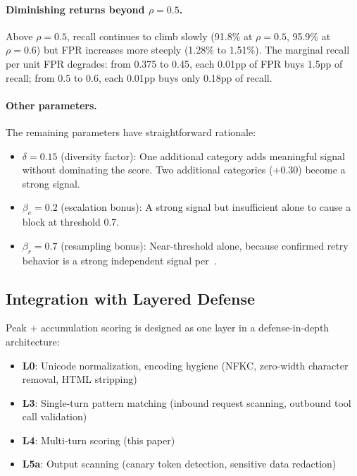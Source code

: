 \documentclass[11pt,a4paper]{article}
\begin{document}
\paragraph{Diminishing returns beyond $\rho = 0.5$.}
Above $\rho = 0.5$, recall continues to climb slowly (91.8\% at
$\rho = 0.5$, 95.9\% at $\rho = 0.6$) but FPR increases more steeply
(1.28\% to 1.51\%). The marginal recall per unit FPR degrades: from
0.375 to 0.45, each 0.01pp of FPR buys 1.5pp of recall; from 0.5 to
0.6, each 0.01pp buys only 0.18pp of recall.

\paragraph{Other parameters.}
The remaining parameters have straightforward rationale:
\begin{itemize}[nosep]
  \item $\delta = 0.15$ (diversity factor): One additional category adds
    meaningful signal without dominating the score. Two additional
    categories ($+0.30$) become a strong signal.
  \item $\beta_e = 0.2$ (escalation bonus): A strong signal but
    insufficient alone to cause a block at threshold 0.7.
  \item $\beta_r = 0.7$ (resampling bonus): Near-threshold alone,
    because confirmed retry behavior is a strong independent signal
    per~\cite{yangsimpler}.
\end{itemize}

\subsection{Integration with Layered Defense}

Peak + accumulation scoring is designed as one layer in a
defense-in-depth architecture:

\begin{itemize}[nosep]
  \item \textbf{L0}: Unicode normalization, encoding hygiene (NFKC,
    zero-width character removal, HTML stripping)
  \item \textbf{L3}: Single-turn pattern matching (inbound request
    scanning, outbound tool call validation)
  \item \textbf{L4}: Multi-turn scoring (this paper)
  \item \textbf{L5a}: Output scanning (canary token detection, sensitive
    data redaction)
\end{itemize}
\end{document}
